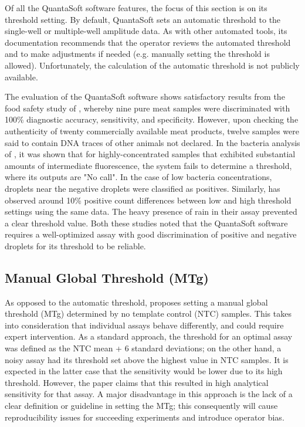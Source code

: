 Of all the QuantaSoft software features, the focus of this section is on its threshold setting. By default, QuantaSoft sets an automatic threshold to the single-well or multiple-well amplitude data. As with other automated tools, its documentation recommends that the operator reviews the automated threshold and to make adjustments if needed (e.g. manually setting the threshold is allowed). Unfortunately, the calculation of the automatic threshold is not publicly available.


The evaluation of the QuantaSoft software shows satisfactory results from the food safety study of , whereby nine pure meat samples were discriminated with 100\% diagnostic accuracy, sensitivity, and specificity. However, upon checking the authenticity of twenty commercially available meat products, twelve samples were said to contain DNA traces of other animals not declared. In the bacteria analysis of , it was shown that for highly-concentrated samples that exhibited substantial amounts of intermediate fluorescence, the system fails to determine a threshold, where its outputs are "No call". In the case of low bacteria concentrations, droplets near the negative droplets were classified as positives. Similarly,  has observed around 10\% positive count differences between low and high threshold settings using the same data. The heavy presence of rain in their assay prevented a clear threshold value. Both these studies noted that the QuantaSoft software requires a well-optimized assay with good discrimination of positive and negative droplets for its threshold to be reliable. 

\subsection{Manual Global Threshold (MTg)}
\label{sec:manthreshold}
As opposed to the automatic threshold,  proposes setting a manual global threshold (MTg) determined by no template control (NTC) samples. This takes into consideration that individual assays behave differently, and could require expert intervention. As a standard approach, the threshold for an optimal assay was defined as the NTC mean + 6 standard deviations; on the other hand, a noisy assay had its threshold set above the highest value in NTC samples. It is expected in the latter case that the sensitivity would be lower due to its high threshold. However, the paper claims that this resulted in high analytical sensitivity for that assay. A major disadvantage in this approach is the lack of a clear definition or guideline in setting the MTg; this consequently will cause reproducibility issues for succeeding experiments and introduce operator bias.

